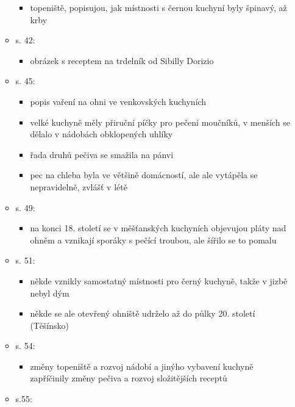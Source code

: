 \begin{itemize}
\begin{itemize}
    \begin{itemize}
    \tightlist
    \item
      topeniště, popisujou, jak místnosti s černou kuchyní byly špinavý,
      až krby
    \end{itemize}
  \item
    s. 42:

    \begin{itemize}
    \tightlist
    \item
      obrázek s receptem na trdelník od Sibilly Dorizio
    \end{itemize}
  \item
    s. 45:

    \begin{itemize}
    \tightlist
    \item
      popis vaření na ohni ve venkovských kuchyních
    \item
      velké kuchyně měly přiruční píčky pro pečení moučníků, v menších
      se dělalo v nádobách obklopených uhlíky
    \item
      řada druhů pečiva se smažila na pánvi
    \item
      pec na chleba byla ve většině domácností, ale ale vytápěla se
      nepravidelně, zvlášť v létě
    \end{itemize}
  \item
    s. 49:

    \begin{itemize}
    \tightlist
    \item
      na konci 18. století se v měšťanských kuchyních objevujou pláty
      nad ohněm a vznikají sporáky s pečící troubou, ale šířilo se to
      pomalu
    \end{itemize}
  \item
    s. 51:

    \begin{itemize}
    \tightlist
    \item
      někde vznikly samostatný místnosti pro černý kuchyně, takže v
      jizbě nebyl dým
    \item
      někde se ale otevřený ohniště udrželo až do půlky 20. století
      (Těšínsko)
    \end{itemize}
  \item
    s. 54:

    \begin{itemize}
    \tightlist
    \item
      změny topeniště a rozvoj nádobí a jinýho vybavení kuchyně
      zapříčinily změny pečiva a rozvoj složitějších receptů
    \end{itemize}
  \item
    s.55:


\end{itemize}
\end{itemize}
